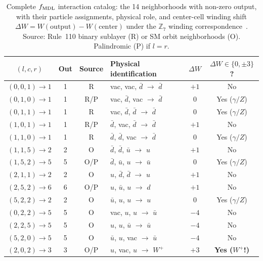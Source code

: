 \documentclass[11pt]{article}
\theoremstyle{remark}
\begin{document}
\begin{table}[H]
\centering
\small
\caption{Complete $f_{\rm MDL}$ interaction catalog: the 14 neighborhoods with
non-zero output, with their particle assignments, physical role, and center-cell
winding shift $\Delta W = W(\text{output}) - W(\text{center})$ under the
$\mathbb{Z}_7$ winding correspondence~\cite{Spivack2026_SM_UGP}.
Source: Rule~110 binary sublayer (R) or SM orbit neighborhoods (O).
Palindromic (P) if $l = r$.}
\label{tab:catalog}
\begin{tabularx}{\textwidth}{c c c P{4.0cm} c c}
\toprule
$(l, c, r)$ & Out & Source & Physical identification &
  $\Delta W$ & $\Delta W \in \{0,\pm3\}$? \\
\midrule
$(0,0,1) \to 1$ & 1 & R  & vac, vac, $\bar d$ $\to$ $\bar d$       & $+1$ & No \\
$(0,1,0) \to 1$ & 1 & R/P& vac, $\bar d$, vac $\to$ $\bar d$       & $0$  & Yes ($\gamma/Z$) \\
$(0,1,1) \to 1$ & 1 & R  & vac, $\bar d$, $\bar d$ $\to$ $\bar d$  & $0$  & Yes ($\gamma/Z$) \\
$(1,0,1) \to 1$ & 1 & R/P& $\bar d$, vac, $\bar d$ $\to$ $\bar d$  & $+1$ & No \\
$(1,1,0) \to 1$ & 1 & R  & $\bar d$, $\bar d$, vac $\to$ $\bar d$  & $0$  & Yes ($\gamma/Z$) \\
\midrule
$(1,1,5) \to 2$ & 2 & O  & $\bar d$, $\bar d$, $\bar u$ $\to$ $u$  & $+1$ & No \\
$(1,5,2) \to 5$ & 5 & O/P& $\bar d$, $\bar u$, $u$ $\to$ $\bar u$  & $0$  & Yes ($\gamma/Z$) \\
$(2,1,1) \to 2$ & 2 & O  & $u$, $\bar d$, $\bar d$ $\to$ $u$       & $+1$ & No \\
$(2,5,2) \to 6$ & 6 & O/P& $u$, $\bar u$, $u$ $\to$ $d$            & $+1$ & No \\
$(5,2,2) \to 2$ & 2 & O  & $\bar u$, $u$, $u$ $\to$ $u$            & $0$  & Yes ($\gamma/Z$) \\
\midrule
$(0,2,2) \to 5$ & 5 & O  & vac, $u$, $u$ $\to$ $\bar u$            & $-4$ & No \\
$(2,2,5) \to 5$ & 5 & O  & $u$, $u$, $\bar u$ $\to$ $\bar u$       & $-4$ & No \\
$(5,2,0) \to 5$ & 5 & O  & $\bar u$, $u$, vac $\to$ $\bar u$       & $-4$ & No \\
\midrule
$(2,0,2) \to 3$ & 3 & O/P& $u$, vac, $u$ $\to$ $W^+$              & $+3$ & \textbf{Yes ($W^+$!)} \\
\bottomrule
\end{tabularx}
\end{table}
\end{document}
